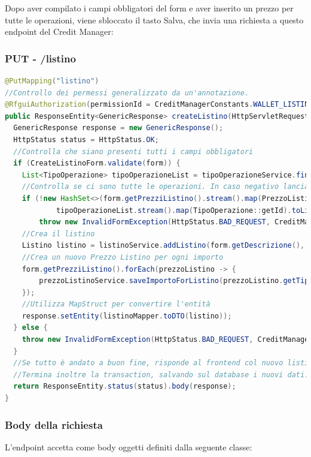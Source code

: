 Dopo aver compilato i campi obbligatori del form e aver inserito un prezzo per tutte le operazioni, viene sbloccato il
tasto Salva, che invia una richiesta a questo endpoint del Credit Manager:

\subsubsection{PUT - /listino}
\begin{lstlisting}[language=Java, breaklines=true]
@PutMapping("listino")
//Controllo dei permessi generalizzato da un'annotazione.
@RfguiAuthorization(permissionId = CreditManagerConstants.WALLET_LISTINO_PREZZI_MENU_PERMISSION, writePerm = true)
public ResponseEntity<GenericResponse> createListino(HttpServletRequest req, @RequestBody CreateListinoForm form) {
  GenericResponse response = new GenericResponse();
  HttpStatus status = HttpStatus.OK;
  //Controlla che siano presenti tutti i campi obbligatori
  if (CreateListinoForm.validate(form)) {
    List<TipoOperazione> tipoOperazioneList = tipoOperazioneService.findAllExceptSentinel();
    //Controlla se ci sono tutte le operazioni. In caso negativo lancia errore, annullando la transaction
    if (!new HashSet<>(form.getPrezziListino().stream().map(PrezzoListinoForm::getTipoOperazioneId).toList()).containsAll(
            tipoOperazioneList.stream().map(TipoOperazione::getId).toList()))
        throw new InvalidFormException(HttpStatus.BAD_REQUEST, CreditManagerConstants.ERROR_INVALID_FORM);
    //Crea il listino
    Listino listino = listinoService.addListino(form.getDescrizione(), form.getFasciaPrezzo());
    //Crea un nuovo Prezzo Listino per ogni importo
    form.getPrezziListino().forEach(prezzoListino -> {
        prezzoListinoService.saveImportoForListino(prezzoListino.getTipoOperazioneId(), listino, Money.of(prezzoListino.getImporto(), "EUR"));
    });
    //Utilizza MapStruct per convertire l'entità
    response.setEntity(listinoMapper.toDTO(listino));
  } else {
    throw new InvalidFormException(HttpStatus.BAD_REQUEST, CreditManagerConstants.ERROR_INVALID_FORM);
  }
  //Se tutto è andato a buon fine, risponde al frontend col nuovo listino.
  //Termina inoltre la transaction, salvando sul database i nuovi dati.
  return ResponseEntity.status(status).body(response);
}
\end{lstlisting}
\subsubsection{Body della richiesta}
L'endpoint accetta come body oggetti definiti dalla seguente classe:

